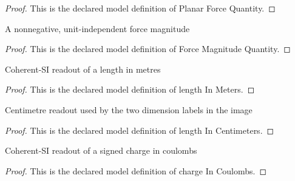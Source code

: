 \begin{proof}
  This is the declared model definition of Planar Force Quantity.
\end{proof}
\begin{definition}
  \label{def:physics:phyx-mini-0895:phyxminiproblems-problemphyxmini0895-forcemagnitudequantity}
  A nonnegative, unit-independent force magnitude
\end{definition}
\begin{proof}
  This is the declared model definition of Force Magnitude Quantity.
\end{proof}
\begin{definition}
  \label{def:physics:phyx-mini-0895:phyxminiproblems-problemphyxmini0895-lengthinmeters}
  Coherent-SI readout of a length in metres
\end{definition}
\begin{proof}
  This is the declared model definition of length In Meters.
\end{proof}
\begin{definition}
  \label{def:physics:phyx-mini-0895:phyxminiproblems-problemphyxmini0895-lengthincentimeters}
  Centimetre readout used by the two dimension labels in the image
\end{definition}
\begin{proof}
  This is the declared model definition of length In Centimeters.
\end{proof}
\begin{definition}
  \label{def:physics:phyx-mini-0895:phyxminiproblems-problemphyxmini0895-chargeincoulombs}
  Coherent-SI readout of a signed charge in coulombs
\end{definition}
\begin{proof}
  This is the declared model definition of charge In Coulombs.
\end{proof}
